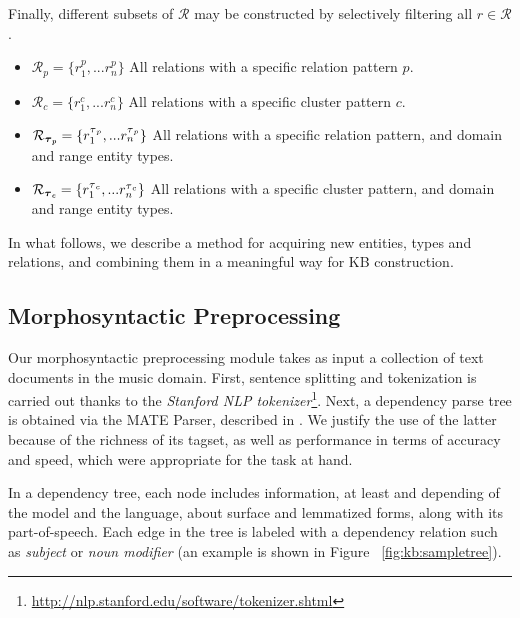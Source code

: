 Finally, different subsets of $\mathcal{R}$ may be constructed by selectively filtering all $r \in \mathcal{R}$.  

\begin{itemize}
    \item $\mathcal{R}_{p} = \{r_1^p, ... r_n^p\}$ All relations with a specific relation pattern $p$.
    \item $\mathcal{R}_{c} = \{r_1^c, ... r_n^c\}$ All relations with a specific cluster pattern $c$.
    \item $\mathcal{R}_{\boldsymbol\tau{_\textbf{\textit{p}}}} = \{r_1^{\tau{_p}}, ... r_n^{\tau{_p}}\}$ All relations with a specific relation pattern, and domain and range entity types.
    \item $\mathcal{R}_{\boldsymbol\tau{_\textbf{\textit{c}}}} = \{r_1^{\tau{_c}}, ... r_n^{\tau{_c}}\}$ All relations with a specific cluster pattern, and domain and range entity types.
\end{itemize}

In what follows, we describe a method for acquiring new entities, types and relations, and combining them in a meaningful way for \textsc{KB} construction.


\subsection{Morphosyntactic Preprocessing}\label{sec:kb:method:preprocessing}

Our morphosyntactic preprocessing module takes as input a collection of text documents in the music domain. First, sentence splitting and tokenization is carried out thanks to the \textit{Stanford NLP tokenizer}\footnote{\url{http://nlp.stanford.edu/software/tokenizer.shtml}}. 
Next, a dependency parse tree is obtained via the MATE Parser, described in \cite{Bohnet2010}. We justify the use of the latter because of the richness of its tagset, as well as performance in terms of accuracy and speed, which were appropriate for the task at hand.

In a dependency tree, each node includes information, at least and depending of the model and the language, about surface and lemmatized forms, along with its part-of-speech. Each edge in the tree is labeled with a dependency relation such as \textit{subject} or \textit{noun modifier} (an example is shown in Figure ~\ref{fig:kb:sampletree}).


